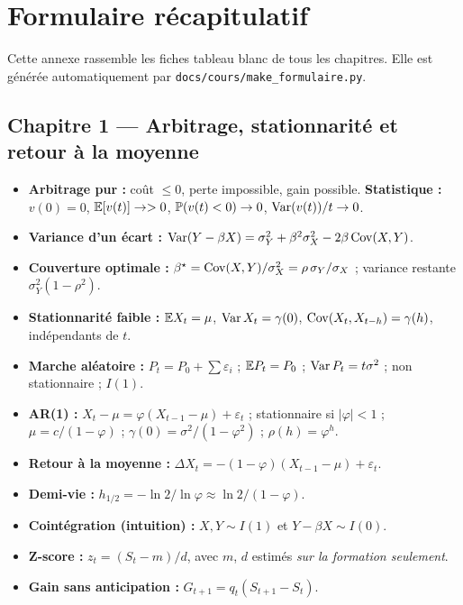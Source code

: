 \chapter{Formulaire récapitulatif}
\label{ann:formulaire}

Cette annexe rassemble les fiches \og tableau blanc\fg{} de tous les chapitres. Elle est générée automatiquement par \texttt{docs/cours/make\_formulaire.py}.

\section*{Chapitre 1 — Arbitrage, stationnarité et retour à la moyenne}
\begin{itemize}[leftmargin=1.2em,itemsep=0.05em]
\item \textbf{Arbitrage pur :} coût $\le 0$, perte impossible, gain possible. \textbf{Statistique :} $v(0)=0$, $\mathbb{E}[v(t)]\to>0$, $\mathbb{P}(v(t)<0)\to0$, $\operatorname{Var}(v(t))/t\to0$.
\item \textbf{Variance d'un écart :} $\operatorname{Var}(Y-\beta X) = \sigma_Y^2 + \beta^2\sigma_X^2 - 2\beta\operatorname{Cov}(X,Y)$.
\item \textbf{Couverture optimale :} $\beta^\star = \operatorname{Cov}(X,Y)/\sigma_X^2 = \rho\,\sigma_Y/\sigma_X$ ; variance restante $\sigma_Y^2(1-\rho^2)$.
\item \textbf{Stationnarité faible :} $\mathbb{E} X_t = \mu$, $\operatorname{Var} X_t = \gamma(0)$, $\operatorname{Cov}(X_t,X_{t-h}) = \gamma(h)$, indépendants de $t$.
\item \textbf{Marche aléatoire :} $P_t = P_0 + \sum\varepsilon_i$ ; $\mathbb{E} P_t = P_0$ ; $\operatorname{Var} P_t = t\sigma^2$ ; non stationnaire ; $I(1)$.
\item \textbf{AR(1) :} $X_t - \mu = \varphi(X_{t-1}-\mu) + \varepsilon_t$ ; stationnaire si $|\varphi|<1$ ; $\mu = c/(1-\varphi)$ ; $\gamma(0) = \sigma^2/(1-\varphi^2)$ ; $\rho(h) = \varphi^h$.
\item \textbf{Retour à la moyenne :} $\Delta X_t = -(1-\varphi)(X_{t-1}-\mu) + \varepsilon_t$.
\item \textbf{Demi-vie :} $h_{1/2} = -\ln2/\ln\varphi \approx \ln 2/(1-\varphi)$.
\item \textbf{Cointégration (intuition) :} $X, Y \sim I(1)$ et $Y - \beta X \sim I(0)$.
\item \textbf{Z-score :} $z_t = (S_t - m)/d$, avec $m$, $d$ estimés \emph{sur la formation seulement}.
\item \textbf{Gain sans anticipation :} $G_{t+1} = q_t(S_{t+1}-S_t)$.
\end{itemize}

